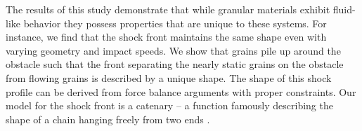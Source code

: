 The results of this study demonstrate that while granular materials exhibit fluid-like behavior they possess properties that are unique to these systems. For instance, we find that the shock front maintains the same shape even with varying geometry and impact speeds. We show that grains pile up around the obstacle such that the front separating the nearly static grains on the obstacle from flowing grains is described by a unique shape. The shape of this shock profile can be derived from force balance arguments with proper constraints. Our model for the shock front is a catenary – a function famously describing the shape of a chain hanging freely from two ends \cite{goldstein_classical_2002, mareno}.